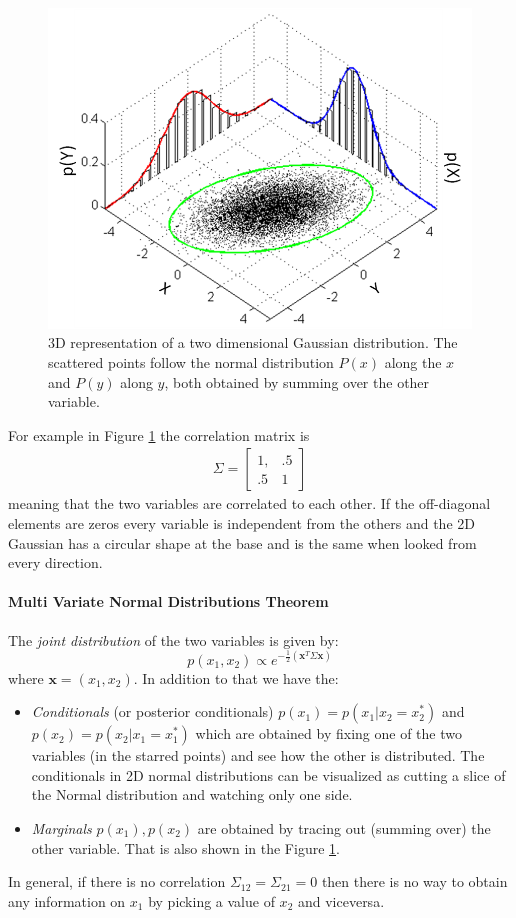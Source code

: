 \documentclass{article}
\begin{document}
\begin{figure}
    \centering
    \includegraphics[width = .7\linewidth]{mvn2d.png}
    \caption{3D representation of a two dimensional Gaussian distribution. The scattered points follow the normal distribution $P(x)$ along the $x$ and $P(y)$ along $y$, both obtained by summing over the other variable.}
    \label{mvn2d}
\end{figure}

For example in Figure \ref{mvn2d} the correlation matrix is
\begin{align*}
    \Sigma = 
    \begin{bmatrix}
    1, & .5 \\
    .5 & 1
    \end{bmatrix}
\end{align*}
meaning that the two variables are correlated to each other. If the off-diagonal elements are zeros every variable is independent from the others and the 2D Gaussian has a circular shape at the base and is the same when looked from every direction. 

\paragraph{Multi Variate Normal Distributions Theorem}
The \textit{joint distribution} of the two variables is given by:
\begin{equation}
    p(x_1, x_2) \propto e^{-\frac{1}{2}(\mathbf{x}^T \Sigma \mathbf{x})}
\end{equation}
where $\mathbf{x} = (x_1, x_2)$. In addition to that we have the:
\begin{itemize}
    \item \textit{Conditionals} (or posterior conditionals) $p(x_1) = p(x_1 | x_2 = x_2^*)$ and $p(x_2) = p(x_2 | x_1 = x_1^*)$ which are obtained by fixing one of the two variables (in the starred points) and see how the other is distributed. The conditionals in 2D normal distributions can be visualized as cutting a slice of the Normal distribution and watching only one side. 
    \item \textit{Marginals} $p(x_1), p(x_2)$ are obtained by tracing out (summing over) the other variable. That is also shown in the Figure \ref{mvn2d}.
\end{itemize} 
In general, if there is no correlation $\Sigma_{12} = \Sigma_{21} = 0$ then there is no way to obtain any information on $x_1$ by picking a value of $x_2$ and viceversa. 
\end{document}
